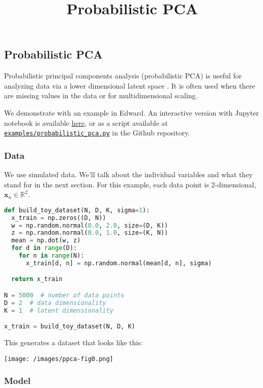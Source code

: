 \title{Probabilistic PCA}

\subsection{Probabilistic PCA}

Probabilistic principal components analysis (probabilistic PCA) is
useful for analyzing data via a lower dimensional latent space
\citep{tipping1999probabilistic}. It is often
used when there are missing values in the data or for multidimensional
scaling.

We demonstrate with an example in Edward.
An interactive version with Jupyter notebook is available
\href{http://nbviewer.jupyter.org/github/blei-lab/edward/blob/master/docs/notebooks/probabilistic_pca.ipynb}{here},
or as a script available at
\href{https://github.com/blei-lab/edward/blob/master/examples/probabilistic_pca.py}
{\texttt{examples/probabilistic_pca.py}} in the Github repository.

\subsubsection{Data}

We use simulated data. We'll talk about the individual variables and
what they stand for in the next section. For this example, each data
point is 2-dimensional, $\mathbf{x}_n\in\mathbb{R}^2$.

\begin{lstlisting}[language=Python]
def build_toy_dataset(N, D, K, sigma=1):
  x_train = np.zeros((D, N))
  w = np.random.normal(0.0, 2.0, size=(D, K))
  z = np.random.normal(0.0, 1.0, size=(K, N))
  mean = np.dot(w, z)
  for d in range(D):
    for n in range(N):
      x_train[d, n] = np.random.normal(mean[d, n], sigma)

  return x_train

N = 5000  # number of data points
D = 2  # data dimensionality
K = 1  # latent dimensionality

x_train = build_toy_dataset(N, D, K)
\end{lstlisting}

This generates a dataset that looks like this:

\texttt{[image: /images/ppca-fig0.png]}

\subsubsection{Model}

